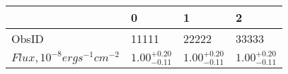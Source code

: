 \begin{tabular}{llll}
\toprule
{} &                       0 &                       1 &                       2 \\
\midrule
ObsID                               &                   11111 &                   22222 &                   33333 \\
$ Flux, 10^{-8} erg s^{-1} cm^{-2}$ &  $1.00^{+0.20}_{-0.11}$ &  $1.00^{+0.20}_{-0.11}$ &  $1.00^{+0.20}_{-0.11}$ \\
\bottomrule
\end{tabular}
